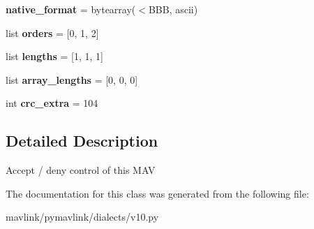 \begin{DoxyCompactItemize}
\item 
\mbox{\label{classpymavlink_1_1dialects_1_1v10_1_1MAVLink__change__operator__control__ack__message_ac8fe10ad9cafa63eef30892781d73773}} 
{\bfseries native\+\_\+format} = bytearray(\textquotesingle{}$<$B\+BB\textquotesingle{}, \textquotesingle{}ascii\textquotesingle{})
\item 
\mbox{\label{classpymavlink_1_1dialects_1_1v10_1_1MAVLink__change__operator__control__ack__message_a26e631ad3a3163e114ea4bcb309856dd}} 
list {\bfseries orders} = \mbox{[}0, 1, 2\mbox{]}
\item 
\mbox{\label{classpymavlink_1_1dialects_1_1v10_1_1MAVLink__change__operator__control__ack__message_a2dd1eb9ff8c3d7b369c57f51cea34b7c}} 
list {\bfseries lengths} = \mbox{[}1, 1, 1\mbox{]}
\item 
\mbox{\label{classpymavlink_1_1dialects_1_1v10_1_1MAVLink__change__operator__control__ack__message_afedbc1114257d20a36eab23dee9417ef}} 
list {\bfseries array\+\_\+lengths} = \mbox{[}0, 0, 0\mbox{]}
\item 
\mbox{\label{classpymavlink_1_1dialects_1_1v10_1_1MAVLink__change__operator__control__ack__message_a822c009817464fc7200333220ab40c44}} 
int {\bfseries crc\+\_\+extra} = 104
\end{DoxyCompactItemize}


\subsection{Detailed Description}
\begin{DoxyVerb}Accept / deny control of this MAV
\end{DoxyVerb}
 

The documentation for this class was generated from the following file\+:\begin{DoxyCompactItemize}
\item 
mavlink/pymavlink/dialects/v10.\+py\end{DoxyCompactItemize}
